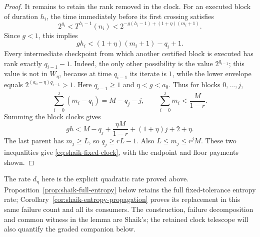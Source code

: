 \documentclass[11pt]{article}
\theoremstyle{remark}\newtheorem{remark}[proposition]{Remark}
\begin{document}
\begin{proof}
It remains to retain the rank removed in the clock.
For an executed block of duration \(h_i\), the time immediately before
its first crossing satisfies
\[
 2^{q_i}<T^{h_i-1}(n_i)
 <2^{-g(h_i-1)+(1+\eta)(m_i+1)}.
\]
Since \(g<1\), this implies
\[
 gh_i<(1+\eta)(m_i+1)-q_i+1.
\]
Every intermediate checkpoint from which another certified block is
executed has rank exactly \(q_{i-1}-1\). Indeed, the only other possibility
is the value \(2^{q_{i-1}}\); this value is not in \(W_\eta\), because at
time \(q_{i-1}\) its iterate is \(1\), while the lower envelope equals
\(2^{(a_0-\eta)q_{i-1}}>1\).
Here \(q_{i-1}\ge1\) and \(\eta<g<a_0\).
Thus for blocks \(0,\ldots,j\),
\[
 \sum_{i=0}^j(m_i-q_i)=M-q_j-j,\qquad
 \sum_{i=0}^jm_i<\frac{M}{1-r}.
\]
Summing the block clocks gives
\[
 gh<M-q_j+\frac{\eta M}{1-r}+(1+\eta)j+2+\eta.
\]
The last parent has \(m_j\ge L\), so \(q_j\ge rL-1\).
Also \(L\le m_j\le r^jM\). These two inequalities give
\eqref{eq:shaik-fixed-clock}, with the endpoint and floor payments shown.
\end{proof}

The rate \(d_\eta\) here is the explicit quadratic rate proved above.
Proposition~\ref{prop:shaik-full-entropy} below retains the full
fixed-tolerance entropy rate; Corollary~\ref{cor:shaik-entropy-propagation}
proves its replacement in this same failure count and all its consumers.
The construction, failure decomposition and common
witness in the lemma are Shaik's; the retained clock telescope will
also quantify the graded companion below.
\end{document}
